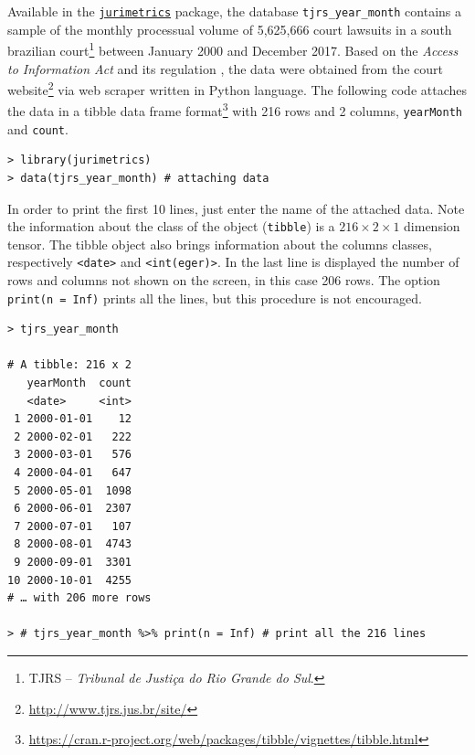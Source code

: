 \documentclass[a4paper]{exam}
\theoremstyle{plain}
\begin{document}
Available in the \href{https://github.com/filipezabala/jurimetrics}{\nolinkurl{jurimetrics}} package, the database \texttt{tjrs\_year\_month} contains a sample of the monthly processual volume of 5,625,666 court lawsuits in a south brazilian court\footnote{ TJRS -- \textit{Tribunal de Justiça do Rio Grande do Sul}.} between January 2000 and December 2017. Based on the \textit{Access to Information Act} \cite{brasil2011lei} and its regulation \cite{brasil2012decreto}, the data were obtained from the court website\footnote{ \url{http://www.tjrs.jus.br/site/}} via web scraper written in Python language. The following code attaches the data in a tibble data frame format\footnote{ \url{https://cran.r-project.org/web/packages/tibble/vignettes/tibble.html}} with 216 rows and 2 columns, \texttt{yearMonth} and \texttt{count}.


\begin{tcolorbox}[colback=black, coltext=white]
\begingroup
\fontsize{9pt}{9pt}\selectfont
\begin{verbatim}
> library(jurimetrics)
> data(tjrs_year_month) # attaching data
\end{verbatim}
\endgroup
\end{tcolorbox}

In order to print the first 10 lines, just enter the name of the attached data. Note the information about the class of the object (\texttt{tibble}) is a $216 \times 2 \times 1$ dimension tensor. The tibble object also brings information about the columns classes, respectively \texttt{<date>} and \texttt{<int(eger)>}. In the last line is displayed the number of rows and columns not shown on the screen, in this case 206 rows. The option \texttt{print(n = Inf)} prints all the lines, but this procedure is not encouraged.

\begin{tcolorbox}[colback=black, coltext=white]
\begingroup
\fontsize{9pt}{9pt}\selectfont
\begin{verbatim}
> tjrs_year_month

# A tibble: 216 x 2
   yearMonth  count
   <date>     <int>
 1 2000-01-01    12
 2 2000-02-01   222
 3 2000-03-01   576
 4 2000-04-01   647
 5 2000-05-01  1098
 6 2000-06-01  2307
 7 2000-07-01   107
 8 2000-08-01  4743
 9 2000-09-01  3301
10 2000-10-01  4255
# … with 206 more rows

> # tjrs_year_month %>% print(n = Inf) # print all the 216 lines
\end{verbatim}
\endgroup
\end{tcolorbox}
\end{document}
